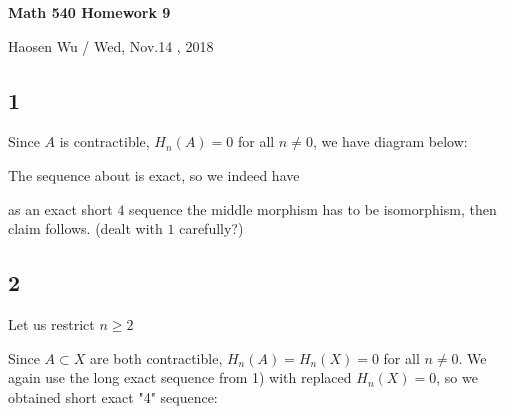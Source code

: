 \documentclass[11pt]{article}
\theoremstyle{remark}
\begin{document}
\begin{center}
    \begin{Large} {\bf Math 540 Homework 9}\\
    \end{Large}
    Haosen Wu  / Wed, Nov.14 , 2018
\end{center}

\subsection*{1}
Since $A$ is contractible, $H_{n}(A)=0$ for all $n\not = 0$,  we have diagram below:

\begin{center}
\end{center}

The sequence about is exact, so we indeed have

\begin{center}
\end{center}

as an exact short $4$ sequence the middle morphism has to be isomorphism, then claim follows. (dealt with $1$ carefully?)


\subsection*{2}
Let us restrict $n\geq 2$

Since $A\subset X$ are both contractible, $H_{n}(A)=H_{n}(X)=0$ for all $n\not = 0$. We again use the long exact sequence from 1) with replaced $H_{n}(X)=0$, so we obtained short exact "4" sequence:

\begin{center}
\end{center}
\end{document}
